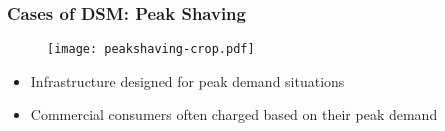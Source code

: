 \documentclass[10pt,aspectratio=169,dvipsnames]{beamer}
\let\olditem\item
\renewcommand{\item}{%
\olditem\vspace{5pt}}
\begin{document}
\begin{frame}
 \frametitle{Cases of DSM: Peak Shaving}

  \begin{minipage}[t]{0.5\textwidth}
     \begin{figure}
  \texttt{[image: peakshaving-crop.pdf]}
  \end{figure}
\end{minipage}\hfill
\begin{minipage}[t]{0.5\textwidth}
\begin{itemize}
\item Infrastructure designed for peak demand situations
\item Commercial consumers often charged based on their peak demand
\end{itemize}
\end{minipage}

\end{frame}
\end{document}
